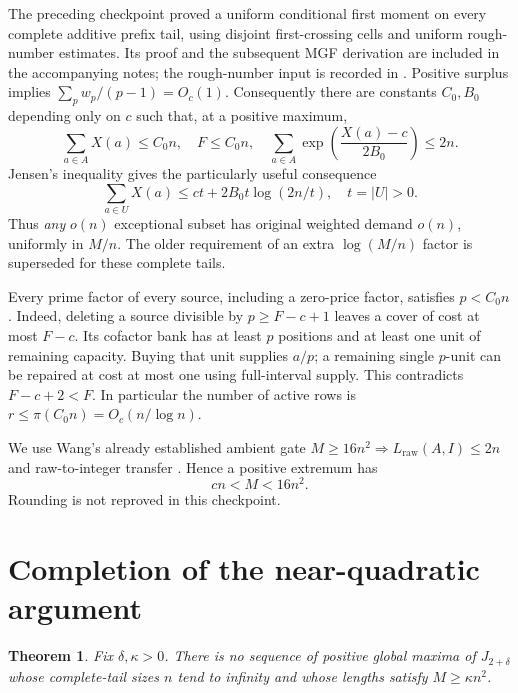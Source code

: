 \documentclass[11pt,a4paper]{article}
\newtheorem{theorem}{Theorem}[section]
\newcommand{\LP}{L_{\mathrm{raw}}}
\begin{document}
The preceding checkpoint proved a uniform conditional first moment on
every complete additive prefix tail, using disjoint first-crossing cells
and uniform rough-number estimates. Its proof and the subsequent MGF
derivation are included in the accompanying notes; the rough-number
input is recorded in \cite{Fan}. Positive surplus implies
$\sum_p w_p/(p-1)=O_c(1)$. Consequently there are constants $C_0,B_0$
depending only on $c$ such that, at a positive maximum,
\begin{equation}
 \sum_{a\in A}X(a)\le C_0n,\quad F\le C_0n,\quad
 \sum_{a\in A}\exp\!\left(\frac{X(a)-c}{2B_0}\right)\le2n.
                                                               \label{eq:mgf}
\end{equation}
Jensen's inequality gives the particularly useful consequence
\begin{equation}
 \boxed{\quad
 \sum_{a\in U}X(a)\le ct+2B_0t\log(2n/t),\quad t=|U|>0.
 \quad}                                                       \label{eq:subset}
\end{equation}
Thus \emph{any} $o(n)$ exceptional subset has original weighted demand
$o(n)$, uniformly in $M/n$. The older requirement of an extra
$\log(M/n)$ factor is superseded for these complete tails.

Every prime factor of every source, including a zero-price factor,
satisfies $p<C_0n$. Indeed, deleting a source divisible by
$p\ge F-c+1$ leaves a cover of cost at most $F-c$. Its cofactor bank
has at least $p$ positions and at least one unit of remaining capacity.
Buying that unit supplies $a/p$; a remaining single $p$-unit can be
repaired at cost at most one using full-interval supply. This contradicts
$F-c+2<F$. In particular the number of active rows is
$r\le\pi(C_0n)=O_c(n/\log n)$.

We use Wang's already established ambient gate
$M\ge16n^2\Rightarrow\LP(A,I)\le2n$ and raw-to-integer transfer
\cite{WangMain,WangRaw}. Hence a positive extremum has
\begin{equation}
 cn<M<16n^2.                                           \label{eq:range}
\end{equation}
Rounding is not reproved in this checkpoint.

\section{Completion of the near-quadratic argument}

\begin{theorem}\label{thm:nearquad}
Fix $\delta,\kappa>0$. There is no sequence of positive global maxima
of $J_{2+\delta}$ whose complete-tail sizes $n$ tend to infinity and
whose lengths satisfy $M\ge\kappa n^2$.
\end{theorem}
\end{document}
